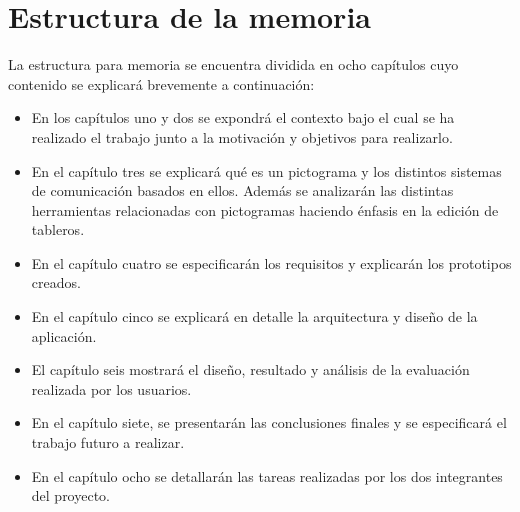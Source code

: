 \section{Estructura de la memoria}
\label{cap1:sec:Estructura}

La estructura para memoria se encuentra dividida en ocho capítulos cuyo contenido se explicará brevemente a continuación: 
\begin{itemize}
	\item En los capítulos uno y dos se expondrá el contexto bajo el cual se ha realizado el trabajo junto a la motivación y objetivos para realizarlo.
	
	\item En el capítulo tres se explicará qué es un pictograma y los distintos sistemas de comunicación basados en ellos. Además se analizarán las distintas herramientas relacionadas con pictogramas haciendo énfasis en la edición de tableros.
	
	\item En el capítulo cuatro se especificarán los requisitos y explicarán los prototipos creados.
	
	\item En el capítulo cinco se explicará en detalle la arquitectura y diseño de la aplicación.
	
	\item El capítulo seis mostrará el diseño, resultado y análisis de la evaluación realizada por los usuarios. 
	
	\item En el capítulo siete, se presentarán las conclusiones finales y se especificará el trabajo futuro a realizar.
	
	\item En el capítulo ocho se detallarán las tareas realizadas por los dos integrantes del proyecto.
\end{itemize}	




